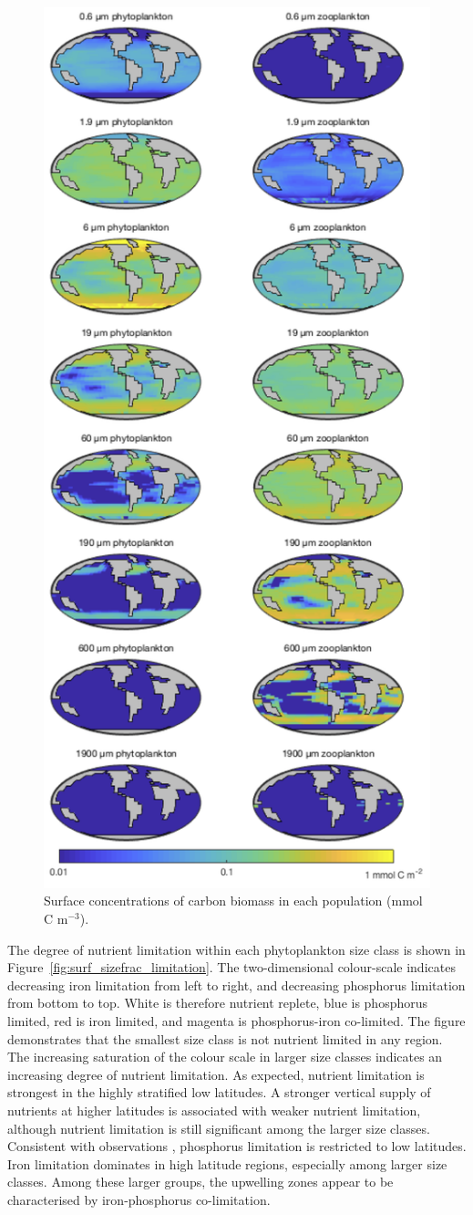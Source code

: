 \documentclass[gmd, manuscript]{copernicus}
\begin{document}
{\begin{figure}[htbp]
\includegraphics[width=0.63\linewidth]{Final_figures/Fig_15.png}
\caption{Surface concentrations of carbon biomass in each population (mmol C m$^{-3}$).}
\label{fig:surf_sizefrac}
\end{figure}

The degree of nutrient limitation within each phytoplankton size class is shown in Figure~\ref{fig:surf_sizefrac_limitation}. The two-dimensional colour-scale indicates decreasing iron limitation from left to right, and decreasing phosphorus limitation from bottom to top. White is therefore nutrient replete, blue is phosphorus limited, red is iron limited, and magenta is phosphorus-iron co-limited. The figure demonstrates that the smallest size class is not nutrient limited in any region. The increasing saturation of the colour scale in larger size classes indicates an increasing degree of nutrient limitation. As expected, nutrient limitation is strongest in the highly stratified low latitudes. A stronger vertical supply of nutrients at higher latitudes is associated with weaker nutrient limitation, although nutrient limitation is still significant among the larger size classes. Consistent with observations \citep{Moore:2013}, phosphorus limitation is restricted to low latitudes. Iron limitation dominates in high latitude regions, especially among larger size classes. Among these larger groups, the upwelling zones appear to be characterised by iron-phosphorus co-limitation.

}
\end{document}
